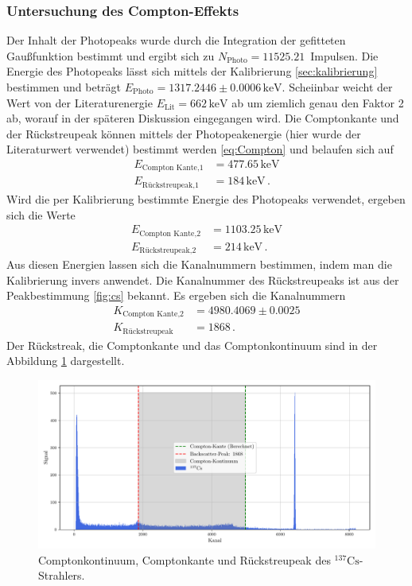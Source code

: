 \subsubsection{Untersuchung des Compton-Effekts}
Der Inhalt der Photopeaks wurde durch die Integration der gefitteten Gaußfunktion bestimmt und ergibt sich zu $N_\text{Photo} = 11525.21 \,$ Impulsen.
Die Energie des Photopeaks lässt sich mittels der Kalibrierung \ref{sec:kalibrierung} bestimmen 
und beträgt $E_\text{Photo} = 1317.2446 \pm 0.0006 \, \si{\kilo\electronvolt}$.
Scheiinbar weicht der Wert von der Literaturenergie $E_\text{Lit} = 662 \, \si{\kilo\electronvolt}$ ab um ziemlich genau den Faktor 2 ab, 
worauf in der späteren Diskussion eingegangen wird.
Die Comptonkante und der Rückstreupeak können mittels der Photopeakenergie (hier wurde der Literaturwert verwendet) bestimmt werden \ref{eq:Compton} und belaufen sich auf
\begin{align*}
  E_\text{Compton Kante,1} &= 477.65 \, \si{\kilo\electronvolt} \\
  E_\text{Rückstreupeak,1} &= 184 \, \si{\kilo\electronvolt} \, .
\end{align*}
Wird die per Kalibrierung bestimmte Energie des Photopeaks verwendet, ergeben sich die Werte
\begin{align*}
  E_\text{Compton Kante,2} &= 1103.25 \, \si{\kilo\electronvolt} \\
  E_\text{Rückstreupeak,2} &= 214 \, \si{\kilo\electronvolt} \, .
\end{align*}
Aus diesen Energien lassen sich die Kanalnummern bestimmen, indem man die Kalibrierung invers anwendet.
Die Kanalnummer des Rückstreupeaks ist aus der Peakbestimmung \ref{fig:cs} bekannt.
Es ergeben sich die Kanalnummern
\begin{align*}
  K_\text{Compton Kante,2} &= 4980.4069 \pm 0.0025 \\
  K_\text{Rückstreupeak} &= 1868 \, .
\end{align*}
Der Rückstreak, die Comptonkante und das Comptonkontinuum sind in der Abbildung \ref{fig:compton} dargestellt.
\begin{figure}[H]
  \centering
  \includegraphics[width=\textwidth]{../plots/Caesium-Compton-Backscatter.pdf}
  \caption{Comptonkontinuum, Comptonkante und Rückstreupeak des $^{137}\text{Cs}$-Strahlers.}
  \label{fig:compton}
\end{figure}
